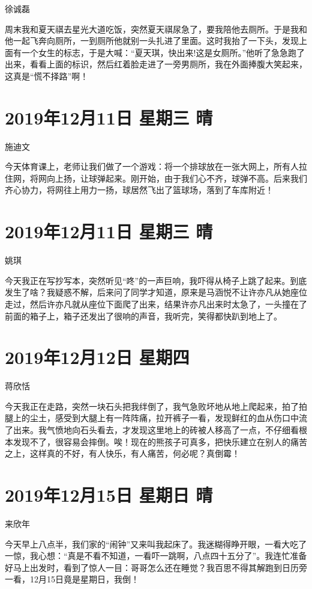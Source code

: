 徐诚磊

周末我和夏天祺去星光大道吃饭，突然夏天祺尿急了，要我陪他去厕所。于是我和他一起飞奔向厕所，一到厕所他就别一头扎进了里面。这时我抬了一下头，发现上面有一个女生的标志，于是大喊：``夏天琪，快出来!这是女厕所。''他听了急急跑了出来，看看上面的标识，然后红着脸走进了一旁男厕所，我在外面捧腹大笑起来，这真是``慌不择路''啊！

\section{2019年12月11日 星期三 晴}

施迪文

今天体育课上，老师让我们做了一个游戏：将一个排球放在一张大网上，所有人拉住网，将网向上扬，让球弹起来。刚开始，由于我们心不齐，球弹不高。后来我们齐心协力，将网往上用力一扬，球居然飞出了篮球场，落到了车库附近！

\section{2019年12月11日 星期三 晴}

姚琪

今天我正在写抄写本，突然听见``咚''的一声巨响，我吓得从椅子上跳了起来。到底发生了啥？我疑惑不解，后来问了同学才知道，原来是马涵悦不让许亦凡从她座位走过，然后许亦凡就从座位下面爬了出来，结果许亦凡出来时太急了，一头撞在了前面的箱子上，箱子还发出了很响的声音，我听完，笑得都快趴到地上了。

\section{2019年12月12日 星期四}

蒋欣恬

今天我正在走路，突然一块石头把我绊倒了，我气急败坏地从地上爬起来，拍了拍腿上的尘土，感受到大腿上有一阵阵痛，拉开裤子一看，发现鲜红的血从伤口中流了出来。我气愤地向石头看去，才发现这里地上的砖被人移高了一点，不仔细看根本发现不了，很容易会摔倒。唉！现在的熊孩子可真多，把快乐建立在别人的痛苦之上，这样真的不好，有人快乐，有人痛苦，何必呢？真倒霉！

\section{2019年12月15日 星期日 晴}

来欣年

今天早上八点半，我们家的``闹钟''又来叫我起床了。我迷糊得睁开眼，一看大吃了一惊，我心想：``真是不看不知道，一看吓一跳啊，八点四十五分了''。我连忙准备好马上出发时，看到了惊人一目：哥哥怎么还在睡觉？我百思不得其解跑到日历旁一看，12月15日竟是星期日，我倒！

